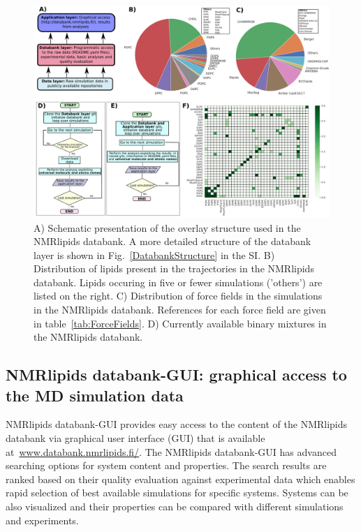 \documentclass[fleqn,10pt]{wlscirep}
\begin{document}
\begin{figure}
    \centering
    \includegraphics[width=\linewidth]{Figures/overlay3.pdf}
    \caption{A) Schematic presentation of the overlay structure used in the NMRlipids databank. A more detailed structure of the databank layer is shown in Fig.~\ref{DatabankStructure} in the SI.
    B) Distribution of lipids present in the trajectories in the NMRlipids databank. Lipids occuring in five or fewer simulations ('others') are listed on the right. 
    C) Distribution of force fields in the simulations in the NMRlipids databank. References for each force field are given in table~\ref{tab:ForceFields}.
    D) Currently available binary mixtures in the NMRlipids databank. 
    }
    \label{fig:overlay}
\end{figure}

\subsection{NMRlipids databank-GUI: graphical access to the MD simulation data}\label{section:access}
NMRlipids databank-GUI provides easy access to the content of the NMRlipids databank via graphical user interface (GUI) that is available at~\url{www.databank.nmrlipids.fi/}. The NMRlipids databank-GUI has advanced searching options for system content and properties. The search results are ranked based on their quality evaluation against experimental data which enables rapid selection of best available simulations for specific systems.  Systems can be also visualized and their properties can be compared with different simulations and experiments. 
\end{document}
